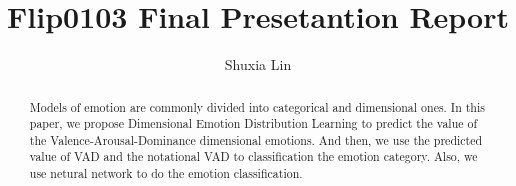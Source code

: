 \documentclass{amsart}
\begin{document}
%
%
\title[Lin's Flip0103]{Flip0103 Final Presetantion Report}%

\author{Shuxia Lin}
\address[A.~1]{School of Computer Science,\\ 
SouthEast University, NanJing 211189, China}%


%
%
\date{\gitAuthorDate}%

\begin{abstract}
Models of emotion are commonly divided into
categorical and dimensional ones.
In this paper,
we propose Dimensional Emotion Distribution Learning
to predict the value of
the Valence-Arousal-Dominance dimensional emotions.
And then,
we use the predicted value of VAD and 
the notational VAD to 
classification the emotion category.
Also,
we use netural network to do 
the emotion classification.
\end{abstract}

\maketitle
\tableofcontents

\newpage



\newpage



\end{document}
